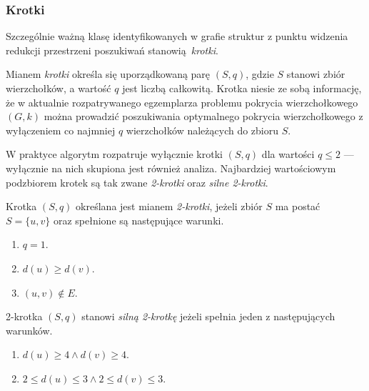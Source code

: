 \subsubsection{Krotki}
\label{sss_ckx_tuples}
\par{
  Szczególnie ważną klasę identyfikowanych w grafie struktur z punktu widzenia redukcji przestrzeni poszukiwań stanowią \emph{krotki}.
  \begin{definition}
    Mianem \emph{krotki} określa się uporządkowaną parę $(S, q)$, gdzie $S$ stanowi zbiór wierzchołków, a wartość $q$ jest liczbą całkowitą.
    Krotka niesie ze sobą informację, że w aktualnie rozpatrywanego egzemplarza problemu pokrycia wierzchołkowego $(G, k)$ można prowadzić poszukiwania optymalnego pokrycia wierzchołkowego z wyłączeniem co najmniej $q$ wierzchołków należących do zbioru $S$.
  \end{definition}
  W praktyce algorytm rozpatruje wyłącznie krotki $(S, q)$ dla wartości $q \leq 2$ --- wyłącznie na nich skupiona jest również analiza.
  Najbardziej wartościowym podzbiorem krotek są tak zwane \emph{2-krotki} oraz \emph{silne 2-krotki}.
  \begin{definition}
    Krotka $(S, q)$ określana jest mianem \emph{2-krotki}, jeżeli zbiór $S$ ma postać $S=\{u, v\}$ oraz spełnione są następujące warunki.
    \begin{enumerate}
      \item $q=1$.
      \item $d(u) \geq d(v)$.
      \item $(u, v) \notin E$.
    \end{enumerate}
  \end{definition}
  \begin{definition}
    2-krotka $(S, q)$ stanowi \emph{silną 2-krotkę} jeżeli spełnia jeden z następujących warunków.
    \begin{enumerate}
      \item $d(u) \geq 4 \land d(v) \geq 4$.
      \item $2 \leq d(u) \leq 3 \land 2 \leq d(v) \leq 3$.
    \end{enumerate}
  \end{definition}
}
